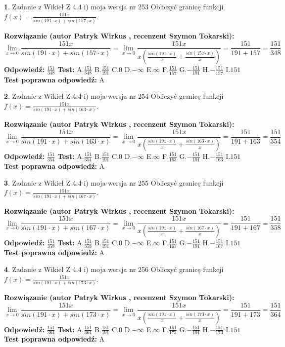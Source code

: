 \documentclass[12pt, a4paper]{article}
\theoremstyle{definition} %
\newtheorem{zad}{}
\newcommand{\zadStart}[1]{\begin{zad}#1\newline}
\newcommand{\zadStop}{\end{zad}}
\newcommand{\rozwStart}[2]{\noindent \textbf{Rozwiązanie (autor #1 , recenzent #2): }\newline}
\newcommand{\rozwStop}{\newline}
\newcommand{\odpStart}{\noindent \textbf{Odpowiedź:}\newline}
\newcommand{\odpStop}{\newline}
\newcommand{\testStart}{\noindent \textbf{Test:}\newline}
\newcommand{\testStop}{\newline}
\newcommand{\kluczStart}{\noindent \textbf{Test poprawna odpowiedź:}\newline}
\newcommand{\kluczStop}{\newline}
\begin{document}
\zadStart{Zadanie z Wikieł Z 4.4 i) moja wersja nr 253}
Obliczyć granicę funkcji $f(x)=\frac{151x}{sin(191\cdot x) +sin(157\cdot x)}$.
\zadStop
\rozwStart{Patryk Wirkus}{Szymon Tokarski}
$$\lim\limits_{x\to 0}\frac{151x}{sin(191\cdot x) +sin(157\cdot x)}=\lim\limits_{x\to 0}\frac{151x}{x(\frac{sin(191\cdot x)}{x}+\frac{sin(157\cdot x)}{x})}=\frac{151}{191+157} = \frac{151}{348}$$
\rozwStop
\odpStart
$\frac{151}{348}$
\odpStop
\testStart
A.$\frac{151}{348}$
B.$\frac{151}{191}$
C.$0$
D.$-\infty$
E.$\infty$
F.$\frac{151}{157}$
G.$-\frac{151}{191}$
H.$-\frac{151}{157}$
I.$151$
\testStop
\kluczStart
A
\kluczStop



\zadStart{Zadanie z Wikieł Z 4.4 i) moja wersja nr 254}
Obliczyć granicę funkcji $f(x)=\frac{151x}{sin(191\cdot x) +sin(163\cdot x)}$.
\zadStop
\rozwStart{Patryk Wirkus}{Szymon Tokarski}
$$\lim\limits_{x\to 0}\frac{151x}{sin(191\cdot x) +sin(163\cdot x)}=\lim\limits_{x\to 0}\frac{151x}{x(\frac{sin(191\cdot x)}{x}+\frac{sin(163\cdot x)}{x})}=\frac{151}{191+163} = \frac{151}{354}$$
\rozwStop
\odpStart
$\frac{151}{354}$
\odpStop
\testStart
A.$\frac{151}{354}$
B.$\frac{151}{191}$
C.$0$
D.$-\infty$
E.$\infty$
F.$\frac{151}{163}$
G.$-\frac{151}{191}$
H.$-\frac{151}{163}$
I.$151$
\testStop
\kluczStart
A
\kluczStop



\zadStart{Zadanie z Wikieł Z 4.4 i) moja wersja nr 255}
Obliczyć granicę funkcji $f(x)=\frac{151x}{sin(191\cdot x) +sin(167\cdot x)}$.
\zadStop
\rozwStart{Patryk Wirkus}{Szymon Tokarski}
$$\lim\limits_{x\to 0}\frac{151x}{sin(191\cdot x) +sin(167\cdot x)}=\lim\limits_{x\to 0}\frac{151x}{x(\frac{sin(191\cdot x)}{x}+\frac{sin(167\cdot x)}{x})}=\frac{151}{191+167} = \frac{151}{358}$$
\rozwStop
\odpStart
$\frac{151}{358}$
\odpStop
\testStart
A.$\frac{151}{358}$
B.$\frac{151}{191}$
C.$0$
D.$-\infty$
E.$\infty$
F.$\frac{151}{167}$
G.$-\frac{151}{191}$
H.$-\frac{151}{167}$
I.$151$
\testStop
\kluczStart
A
\kluczStop



\zadStart{Zadanie z Wikieł Z 4.4 i) moja wersja nr 256}
Obliczyć granicę funkcji $f(x)=\frac{151x}{sin(191\cdot x) +sin(173\cdot x)}$.
\zadStop
\rozwStart{Patryk Wirkus}{Szymon Tokarski}
$$\lim\limits_{x\to 0}\frac{151x}{sin(191\cdot x) +sin(173\cdot x)}=\lim\limits_{x\to 0}\frac{151x}{x(\frac{sin(191\cdot x)}{x}+\frac{sin(173\cdot x)}{x})}=\frac{151}{191+173} = \frac{151}{364}$$
\rozwStop
\odpStart
$\frac{151}{364}$
\odpStop
\testStart
A.$\frac{151}{364}$
B.$\frac{151}{191}$
C.$0$
D.$-\infty$
E.$\infty$
F.$\frac{151}{173}$
G.$-\frac{151}{191}$
H.$-\frac{151}{173}$
I.$151$
\testStop
\kluczStart
A
\kluczStop
\end{document}

